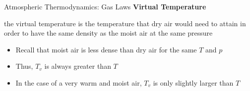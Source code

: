 \begin{frame}{Atmospheric Thermodynamics: Gas Laws}
\textbf{Virtual Temperature}
\begin{fancydefs}
the virtual temperature is the temperature that dry air would need to attain in order to have the same density as the moist air at the same pressure	
\end{fancydefs}
\begin{itemize}
	\item Recall that moist air is less dense than dry air for the same $T$ and $p$
	\item Thus, $T_v$ is always greater than $T$
	\item In the case of a very warm and moist air, $T_v$ is only slightly larger than $T$
	\end{itemize}
\end{frame}

